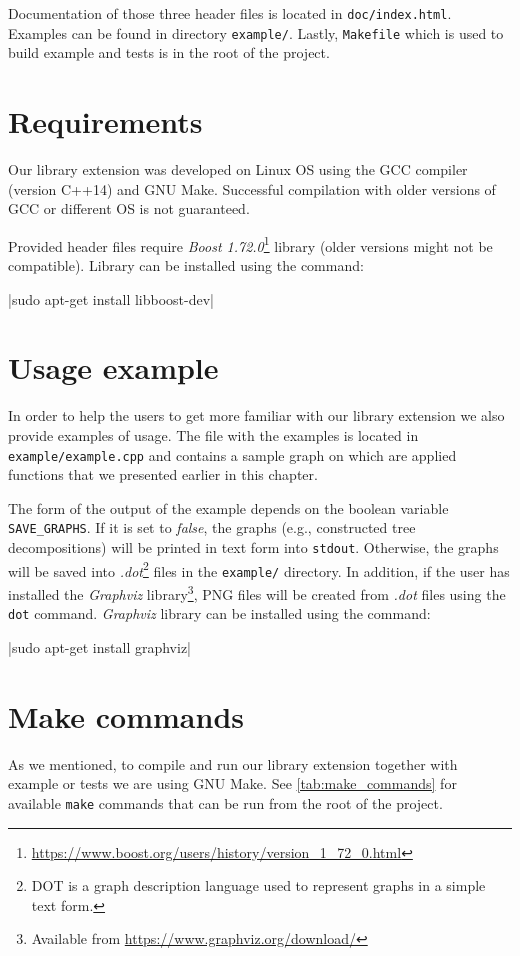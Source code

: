 \documentclass[thesis=B,english]{FITthesis}[2019/03/21]
\begin{document}
Documentation of those three header files is located in \texttt{doc/index.html}. Examples can be found in directory \texttt{example/}. Lastly, \texttt{Makefile} which is used to build example and tests is in the root of the project.


\section{Requirements}
Our library extension was developed on Linux OS using the GCC compiler (version C++14) and GNU Make. Successful compilation with older versions of GCC or different OS is not guaranteed.

Provided header files require \emph{Boost 1.72.0}\footnote{\url{https://www.boost.org/users/history/version_1_72_0.html}} library (older versions might not be compatible). Library can be installed using the command:

|sudo apt-get install libboost-dev|

\section{Usage example}
In order to help the users to get more familiar with our library extension we also provide examples of usage. The file with the examples is located in \texttt{example/example.cpp} and contains a sample graph on which are applied functions that we presented earlier in this chapter.

The form of the output of the example depends on the boolean variable \texttt{SAVE\_GRAPHS}. If it is set to \emph{false}, the graphs (e.g., constructed tree decompositions) will be printed in text form into \texttt{stdout}. Otherwise, the graphs will be saved into \emph{.dot}\footnote{DOT is a graph description language used to represent graphs in a simple text form.} files in the \texttt{example/} directory. In addition, if the user has installed the \emph{Graphviz} library\footnote{Available from \url{https://www.graphviz.org/download/}}, PNG files will be created from \emph{.dot} files using the \texttt{dot} command. \emph{Graphviz} library can be installed using the command:

|sudo apt-get install graphviz|

\section{Make commands}
As we mentioned, to compile and run our library extension together with example or tests we are using GNU Make. See \autoref{tab:make_commands} for available \texttt{make} commands that can be run from the root of the project.
\end{document}
